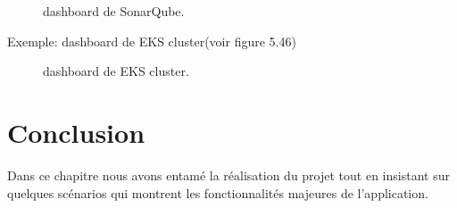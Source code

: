 {\begin{figure}[H]
\begin{center}
    \end{center}
    \caption{dashboard de SonarQube.}
   \end{figure}
    Exemple: dashboard de EKS cluster(voir figure 5.46)
\begin{figure}[H]
    \begin{center}
    \end{center}
    \caption{dashboard de EKS cluster.}
   \end{figure}            
}
\section{\selectfont\Large Conclusion}
 \textsf{\selectfont{} Dans ce chapitre nous avons entamé la réalisation du projet tout en insistant sur quelques scénarios qui montrent les fonctionnalités majeures de l’application. 
}